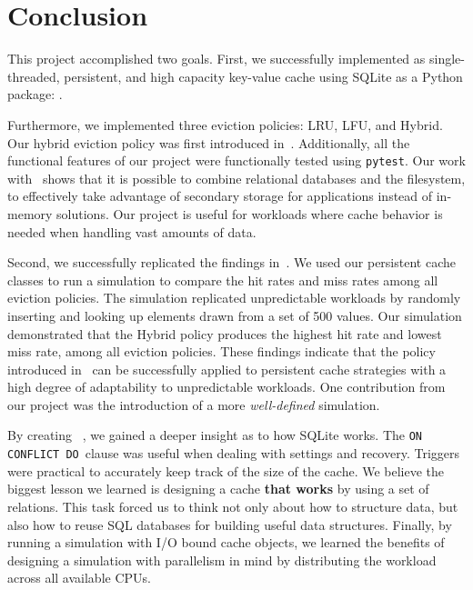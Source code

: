 \section{Conclusion\label{sec:conclusion}}
This project accomplished two goals. First,
we successfully implemented as single-threaded,
persistent, and high capacity key-value cache using
SQLite as a Python package: \sqlitecache.

Furthermore,
we implemented three eviction policies:
LRU, LFU, and Hybrid. Our hybrid eviction
policy was first introduced in~\cite{shah2023ImprovedCacheEviction}.
Additionally, all the functional features of our project
were functionally tested using \texttt{pytest}.
Our work with \sqlitecache~shows that it is possible to combine
relational databases and the filesystem, to effectively
take advantage of secondary storage for applications instead
of in-memory solutions. Our project is useful for workloads
where cache behavior is needed when handling
vast amounts of data.

Second, we successfully replicated the findings in~\cite{shah2023ImprovedCacheEviction}.
We used our persistent cache classes
to run a simulation to compare the hit rates and miss rates
among all eviction policies. The simulation
replicated unpredictable workloads by randomly inserting
and looking up elements drawn from a set of 500 values.
Our simulation demonstrated that the Hybrid policy
produces the highest hit rate and lowest miss rate, among all eviction policies.
These findings indicate that the policy introduced in~\cite{shah2023ImprovedCacheEviction}
can be successfully applied to persistent cache strategies
with a high degree of adaptability to unpredictable workloads.
One contribution from our project was the introduction
of a more \textit{well-defined} simulation.

By creating \sqlitecache~, we gained a deeper insight
as to how SQLite works. The \texttt{ON CONFLICT DO}~clause
was useful when dealing with settings and recovery.
Triggers were practical to accurately keep track
of the size of the cache. We believe the biggest
lesson we learned is designing a cache \textbf{that works}
by using
a set of relations. This task forced us to think
not only about how to structure data, but also how to
reuse SQL databases for building useful data structures.
Finally, by
running a simulation with I/O bound cache objects, we learned the benefits
of designing a simulation with parallelism in mind
by distributing the workload across all
available CPUs.


